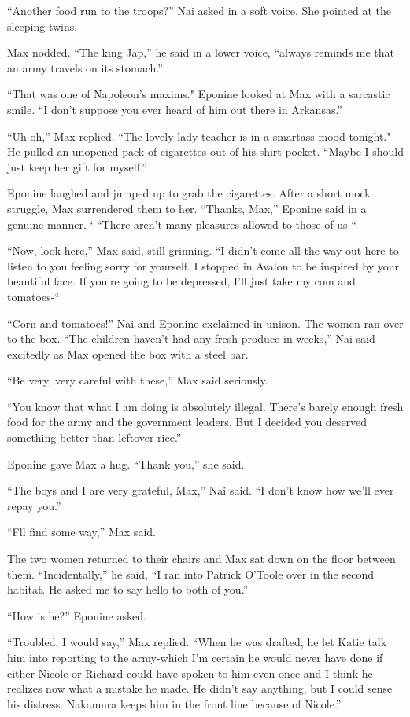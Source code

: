 \documentclass[]{article}
\begin{document}
{{“Another food run to the troops?” Nai asked in a soft voice.  She pointed at the sleeping twins.

Max nodded.  “The king Jap,” he said in a lower voice, “always reminds me that an army travels on its stomach.”

“That was one of Napoleon’s maxims."  Eponine looked at Max with a sarcastic smile.  “I don’t suppose you ever heard of him out there in Arkansas.”

“Uh-oh,” Max replied.  “The lovely lady teacher is in a smartass mood tonight."  He pulled an unopened pack of cigarettes out of his shirt pocket.  “Maybe I should just keep her gift for myself.”

Eponine laughed and jumped up to grab the cigarettes.  After a short mock struggle, Max surrendered them to her.  “Thanks, Max,” Eponine said in a genuine manner.  ‘ “There aren’t many pleasures allowed to those of us-“

“Now, look here,” Max said, still grinning.  “I didn’t come all the way out here to listen to you feeling sorry for yourself.  I stopped in Avalon to be inspired by your beautiful face.  If you’re going to be depressed, I’ll just take my com and tomatoes-“

“Corn and tomatoes!” Nai and Eponine exclaimed in unison.  The women ran over to the box.  “The children haven’t had any fresh produce in weeks,” Nai said excitedly as Max opened the box with a steel bar.

“Be very, very careful with these,” Max said seriously.

“You know that what I am doing is absolutely illegal.  There’s barely enough fresh food for the army and the government leaders.  But I decided you deserved something better than leftover rice.”

Eponine gave Max a hug.  “Thank you,” she said.

“The boys and I are very grateful, Max,” Nai said.  “I don’t know how we’ll ever repay you.”

“Fll find some way,” Max said.

The two women returned to their chairs and Max sat down on the floor between them.  “Incidentally,” he said, “I ran into Patrick O’Toole over in the second habitat.  He asked me to say hello to both of you.”

“How is he?” Eponine asked.

“Troubled, I would say,” Max replied.  “When he was drafted, he let Katie talk him into reporting to the army-which I’m certain he would never have done if either Nicole or Richard could have spoken to him even once-and I think he realizes now what a mistake he made.  He didn’t say anything, but I could sense his distress.  Nakamura keeps him in the front line because of Nicole.”

}}
\end{document}
